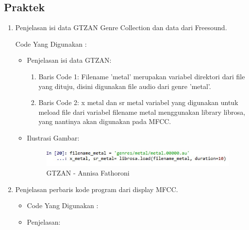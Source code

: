 \subsection{Praktek}
\begin{enumerate}

\item Penjelasan isi data GTZAN Genre Collection dan data dari Freesound.

Code Yang Digunakan :


\begin{itemize}
\item Penjelasan isi data GTZAN:

\begin{enumerate}
\item Baris Code 1: Filename 'metal' merupakan variabel direktori dari file yang dituju, disini digunakan file audio dari genre 'metal'.
\item Baris Code 2: x metal dan sr metal variabel yang digunakan untuk meload file dari variabel filename metal menggunakan library librosa, yang nantinya akan digunakan pada MFCC.

\end{enumerate}

\item Ilustrasi Gambar:

\begin{figure}[!hbtp]
\centering
\includegraphics[scale=0.7]{figures/Chapter6AnnisaFathoroni17.jpeg}
\caption{GTZAN - Annisa Fathoroni}
\label{GTZAN - Annisa Fathoroni}
\end{figure}

\end{itemize}

\item Penjelasan perbaris kode program dari display MFCC.
\begin{itemize}
\item Code Yang Digunakan :


\item Penjelasan:


\end{itemize}
\end{enumerate}
